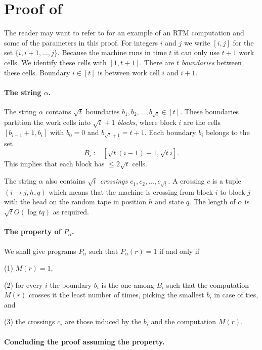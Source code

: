 \documentclass{toc}
\begin{document}
\section{Proof of  \label{sec:Proof-of-simu}}
%

The reader may want to refer to 
for an example of an RTM computation and some of the parameters in
this proof. For integers $i$ and $j$ we write $[i,j]$ for the set
$\{i,i+1,\ldots,j\}$. Because the machine runs in time $t$ it can
only use $t+1$ work cells. We identify these cells with $[1,t+1]$.
There are $t$ \emph{boundaries} between these cells. Boundary $i\in[t]$
is between work cell $i$ and $i+1$.

\paragraph{The string $\alpha$.}

The string $\alpha$ contains $\sqrt{t}$ boundaries $b_{1},b_{2},\ldots,b_{\sqrt{t}}\in[t]$.
These boundaries partition the work cells into $\sqrt{t}+1$\emph{
blocks}, where block $i$ are the cells $[b_{i-1}+1,b_{i}]$ with
$b_{0}=0$ and $b_{\sqrt{t}+1}=t+1$. Each boundary $b_{i}$ belongs
to the set 
\[
B_{i}:=[\sqrt{t}(i-1)+1,\sqrt{t}i].
\]
This implies that each block has $\le2\sqrt{t}$ cells.

The string $\alpha$ also contains $\sqrt{t}$ \emph{crossings $c_{1},c_{2},\ldots,c_{\sqrt{t}}$.}
A crossing $c$ is a tuple $(i\to j,h,q)$ which means that the machine
is crossing from block $i$ to block $j$ with the head on the random
tape in position $h$ and state $q$. The length of $\alpha$ 
is $\sqrt{t}O(\log tq)$ as required.

\paragraph{The property of $P_{\alpha}$.}

We shall give programs $P_{\alpha}$ such that $P_{\alpha}(r)=1$
if and only if

(1) $M(r)=1$,

(2) for every $i$ the boundary $b_{i}$ is the one among $B_{i}$
such that the computation $M(r)$ crosses it the least number of times,
picking the smallest $b_{i}$ in case of ties, and

(3) the crossings $c_{i}$ are those induced by the $b_{i}$ and the
computation $M(r)$.

\paragraph{Concluding the proof assuming the property.}
\end{document}
